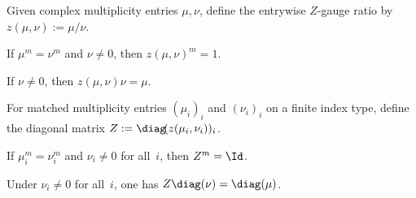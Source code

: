 \begin{definition}\label{def:z_gauge_entry}
    \leanok
    Given complex multiplicity entries $\mu,\nu$, define the entrywise
    $Z$-gauge ratio by $z(\mu,\nu):=\mu/\nu$.
\end{definition}

\begin{lemma}\label{lem:z_gauge_entry_pow}
    \leanok
    If $\mu^m=\nu^m$ and $\nu\neq 0$, then $z(\mu,\nu)^m=1$.
\end{lemma}

\begin{lemma}\label{lem:z_gauge_entry_mul}
    \leanok
    If $\nu\neq 0$, then $z(\mu,\nu)\nu=\mu$.
\end{lemma}

\begin{definition}\label{def:z_gauge_diagonal}
    \leanok
    For matched multiplicity entries $(\mu_i)_i$ and $(\nu_i)_i$ on a finite
    index type, define the diagonal matrix
    $Z:=\diag\!(z(\mu_i,\nu_i))_i$.
\end{definition}

\begin{lemma}%
    \label{lem:z_gauge_diagonal_pow}
    \leanok
    If $\mu_i^m=\nu_i^m$ and $\nu_i\neq 0$ for all~$i$, then $Z^m=\Id$.
\end{lemma}

\begin{lemma}\label{lem:z_gauge_diagonal_mul}
    \leanok
    Under $\nu_i\neq 0$ for all~$i$, one has
    $Z\diag(\nu)=\diag(\mu)$.
\end{lemma}


